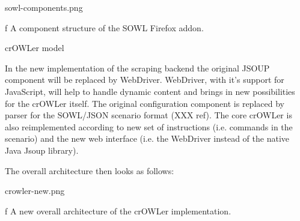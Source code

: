 \midinsert
\picw=12cm \cinspic sowl-components.png
\caption/f A component structure of the SOWL Firefox addon. 
\endinsert


\secc crOWLer model

In the new implementation of the scraping backend the original JSOUP component
will be replaced by WebDriver. WebDriver, with it's support for JavaScript,
will help to handle dynamic content and brings in new possibilities for the
crOWLer itself. The original configuration component is replaced by parser for
the SOWL/JSON scenario format (XXX ref).  The core crOWLer is also
reimplemented according to new set of instructions (i.e. commands in the
scenario) and the new web interface (i.e. the WebDriver instead of the native
Java Jsoup library). 

The overall architecture then looks as follows: 

\midinsert
\picw=7.5cm \cinspic crowler-new.png
\caption/f A new overall architecture of the crOWLer implementation. 
\endinsert



%





